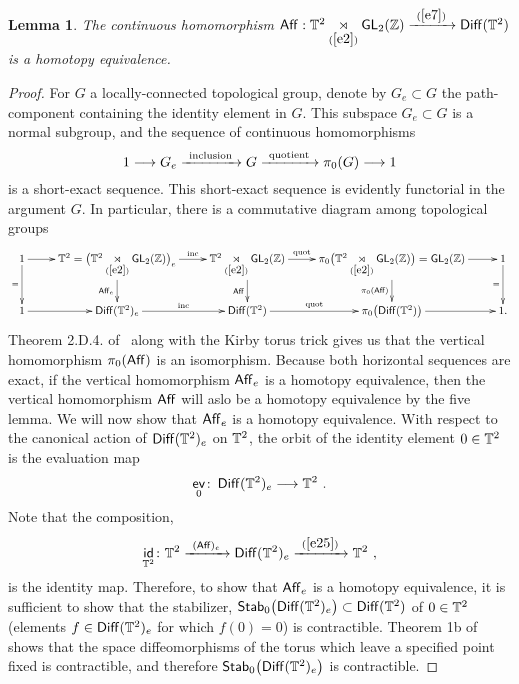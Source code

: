 \documentclass{amsart}
\newtheorem{lemma}[theorem]{Lemma}
\theoremstyle{definition}
\theoremstyle{remark}
\DeclareMathOperator{\ev}{\mathsf{ev}}
\DeclareMathOperator{\Diff}{{\sf Diff}}
\newcommand{\xra}{\xrightarrow}
\DeclareMathOperator{\GL}{\sf GL}
\DeclareMathOperator{\id}{\sf id}
\begin{document}
\begin{lemma}\label{t1}
The continuous homomorphism 
$
{\sf Aff}: \TT^2 \underset{(\ref{e2})}\rtimes \GL_2(\ZZ)
\xra{~(\ref{e7})~}
\Diff(\TT^2)
$
is a homotopy equivalence.
\end{lemma}
\begin{proof}
For $G$ a locally-connected topological group, denote by $G_e \subset G$ the path-component containing the identity element in $G$.
This subspace $G_e\subset G$ is a normal subgroup, and the sequence of continuous homomorphisms
\[
1
\longrightarrow
G_e
\xra{~\rm inclusion~}
G
\xra{~\rm quotient~}
\pi_0(G)
\longrightarrow
1
\]
is a short-exact sequence.
This short-exact sequence is evidently functorial in the argument $G$.
In particular, there is a commutative diagram among topological groups 
\[
\xymatrix{
1 \ar[d]_-= \ar[r]
&
\TT^{2} = \bigl( \TT^{2} \underset{(\ref{e2})}\rtimes \GL_2(\ZZ) \bigr)_e
\ar[d]_-{{\sf Aff}_e}
\ar[r]^-{\rm inc}
&
\TT^{2} \underset{(\ref{e2})}\rtimes \GL_2(\ZZ) 
\ar[d]_-{{\sf Aff}} 
\ar[r]^-{\rm quot}
&
\pi_0 \bigl( \TT^{2} \underset{(\ref{e2})}\rtimes \GL_2(\ZZ)  \bigr)
=
\GL_2(\ZZ)
\ar[d]_-{\pi_0({\sf Aff})}
\ar[r]
&
1 \ar[d]_-=
\\
1
\ar[r]
&
\Diff(\TT^2)_e
\ar[r]^-{\rm inc}
&
\Diff(\TT^2) 
\ar[r]^-{\rm quot}
&
\pi_0 \bigl( \Diff(\TT^2) \bigr)
\ar[r]
&
1
.
}
\] 
Theorem 2.D.4. of~\cite{rolf} along with the Kirby torus trick gives us that the vertical homomorphism $\pi_0({\sf Aff})$ is an isomorphism.  %
Because both horizontal sequences are exact, if the vertical homomorphism ${\sf Aff}_{e}$ is a homotopy equivalence, then the vertical homomorphism ${\sf Aff}$ will aslo be a homotopy equivalence by the five lemma. We will now show that ${\sf Aff}_{e}$ is a homotopy equivalence. 
With respect to the canonical action of $\Diff(\TT^2)_e$ on $\mathbb T^2$, the orbit of the identity element $0\in \mathbb T^2$ is the evaluation map 
\begin{equation}\label{e25}
\ev_0
\colon 
\Diff(\TT^2)_e
\longrightarrow
\TT^2
~.
\end{equation}
Note that the composition,
\[
\id_{\TT^2}
\colon
\TT^2
\xra{~({\sf Aff})_e~}
\Diff(\TT^2)_e
\xra{~(\ref{e25})~}
\TT^2
~,
\]
is the identity map.
Therefore, to show that ${\sf Aff}_e$ is a homotopy equivalence, it is sufficient to show that the stabilizer, ${\sf Stab}_0\bigl(\Diff(\TT^2)_e\bigr) \subset \Diff(\TT^2)$ of $0\in \mathbb T^2$ (elements $f \in \Diff(\TT^2)_e$ for which $f(0) = 0$) is contractible. Theorem 1b of \cite{ee} shows that the space diffeomorphisms of the torus which leave a specified point fixed is contractible, and therefore ${\sf Stab}_0\bigl(\Diff(\TT^2)_e\bigr)$ is contractible. %

\end{proof}
\end{document}
